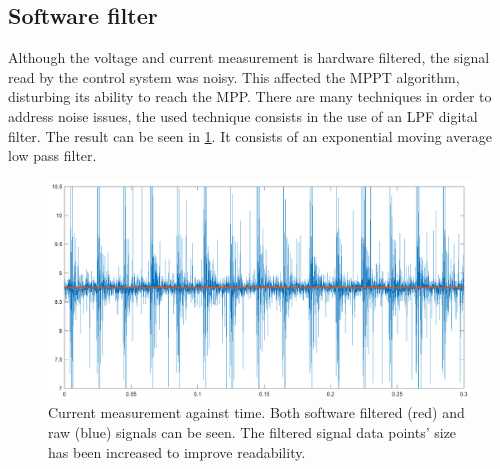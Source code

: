 \subsection{Software filter}
Although the voltage and current measurement is hardware filtered, the signal read by the control system was noisy. This affected the MPPT algorithm, disturbing its ability to reach the MPP. There are many techniques in order to address noise issues, the used technique consists in the use of an LPF digital filter. The result can be seen in \ref{software_filter}. It consists of an exponential moving average low pass filter.  


\begin{figure}[H]
	\begin{center}
		\includegraphics[width=\textwidth]{../Pictures/P1/Discussion/sw_filter_current.png}
		\caption{Current measurement against time. Both software filtered (red) and raw (blue) signals can be seen. The filtered signal data points' size has been increased to improve readability.}
		\label{software_filter}
	\end{center}	
\end{figure}









